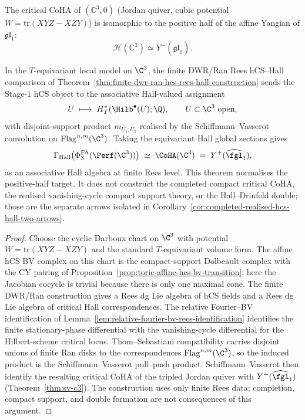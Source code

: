 \begin{theorem}
\label{thm:sv-c3}
The critical CoHA of $(\mathbb{C}^3, 0)$ (Jordan quiver, cubic potential $W = \mathrm{tr}(XYZ - XZY)$) is isomorphic to the positive half of the affine Yangian of $\mathfrak{gl}_1$:
\[
 \mathcal{H}(\mathbb{C}^3) \simeq Y^+(\widehat{\mathfrak{gl}}_1).
\]
\end{theorem}

\begin{theorem}
\label{thm:sv-c3-e3-factorization}
In the $T$-equivariant local model on $\C^3$, the finite
DWR/Ran Rees hCS--Hall comparison of
Theorem~\ref{thm:finite-dwr-ran-hcs-rees-hall-construction} sends the
Stage-$1$ hCS object to the associative Hall-valued assignment
\[
 U \;\longmapsto\; H^*_T(\Hilb^\bullet(U); \Q),
 \qquad U \subset \C^3 \text{ open},
\]
with disjoint-support product $m_{U_1, U_2}$ realised by the
Schiffmann--Vasserot convolution on
$\mathrm{Flag}^{n, m}(\C^3)$. Taking the equivariant Hall global
sections gives
\[
 \Gamma_{\mathrm{Hall}}\bigl(\PhiFA_3(\Perf(\C^3))\bigr)
 \;\simeq\; \CoHA(\C^3) \;=\; Y^+(\widehat{\fgl}_1),
\]
as an associative Hall algebra at finite Rees level. This theorem
normalises the positive-half target. It does not construct the
completed compact critical CoHA, the realised vanishing-cycle compact
support theory, or the Hall--Drinfeld double; those are the separate
arrows isolated in
Corollary~\ref{cor:completed-realised-hcs-hall-two-arrows}.
\end{theorem}

\begin{proof}
Choose the cyclic Darboux chart on $\C^3$ with potential
$W=\mathrm{tr}(XYZ-XZY)$ and the standard $T$-equivariant volume form.
The affine hCS BV complex on this chart is the compact-support
Dolbeault complex with the CY pairing of
Proposition~\ref{prop:toric-affine-hcs-bv-transition}; here the
Jacobian cocycle is trivial because there is only one maximal cone.
The finite DWR/Ran construction gives a Rees dg Lie algebra of hCS
fields and a Rees dg Lie algebra of critical Hall correspondences.
The relative Fourier--BV identification of
Lemma~\ref{lem:relative-fourier-bv-rees-identification} identifies the
finite stationary-phase differential with the vanishing-cycle
differential for the Hilbert-scheme critical locus. Thom--Sebastiani
compatibility carries disjoint unions of finite Ran disks to the
correspondences $\mathrm{Flag}^{n,m}(\C^3)$, so the induced product is
the Schiffmann--Vasserot pull--push product. Schiffmann--Vasserot then
identify the resulting critical CoHA of the tripled Jordan quiver with
$Y^+(\widehat{\fgl}_1)$ (Theorem~\ref{thm:sv-c3}). The construction
uses only finite Rees data; completion, compact support, and double
formation are not consequences of this argument.
\end{proof}

